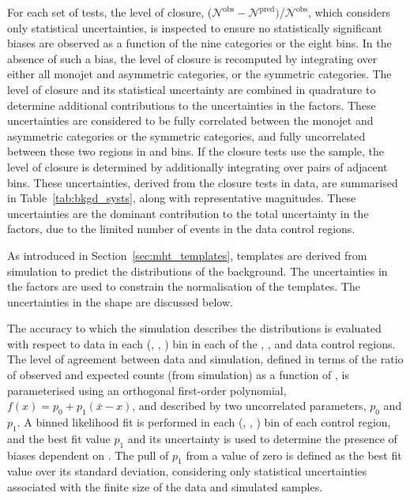 For each set of tests, the level of closure,
($\mathcal{N}^\text{obs} - \mathcal{N}^\text{pred}) /
\mathcal{N}^\text{obs}$, which considers only statistical
uncertainties, is inspected to ensure no statistically significant
biases are observed as a function of the nine \njet categories or the
eight \scalht bins. In the absence of such a bias, the level of
closure is recomputed by integrating over either all monojet and
asymmetric \njet categories, or the symmetric \njet categories. The
level of closure and its statistical uncertainty are combined in
quadrature to determine additional contributions to the uncertainties
in the \tf factors. These uncertainties are considered to be
fully correlated between the monojet and asymmetric \njet categories
or the symmetric \njet categories, and fully uncorrelated between
these two regions in \njet and \scalht bins. If the closure tests use
the \mmj sample, the level of closure is determined by additionally
integrating over pairs of adjacent \scalht bins. These uncertainties,
derived from the closure tests in data, are summarised in
Table~\ref{tab:bkgd_systs}, along with representative
magnitudes. These uncertainties are the dominant contribution to the
total uncertainty in the \tf factors, due to the limited number
of events in the data control regions.




As introduced in Section~\ref{sec:mht_templates}, templates are
derived from simulation to predict the \HTmiss distributions of the
background. The uncertainties in the \tf factors are used to constrain the
normalisation of the \HTmiss templates. The uncertainties in the
\HTmiss shape are discussed below.


The accuracy to which the simulation describes the \HTmiss
distributions is evaluated with respect to data in each (\njet, \nb,
\scalht) bin in each of the \mj, \mmj, and \gj data control regions.
The level of agreement between data and simulation, defined in terms
of the ratio of observed and expected counts (from simulation) as a
function of \HTmiss, is parameterised using an orthogonal first-order
polynomial, $f(x) = p_0 + p_1(\bar{x}-x)$, and described by two
uncorrelated parameters, $p_0$ and $p_1$. A binned likelihood fit is
performed in each (\njet, \nb, \scalht) bin of each control region,
and the best fit value $p_1$ and its uncertainty is used to determine
the presence of biases dependent on \HTmiss. The pull of $p_1$ from a
value of zero is defined as the best fit value over its standard
deviation, considering only statistical uncertainties associated with
the finite size of the data and simulated samples.

